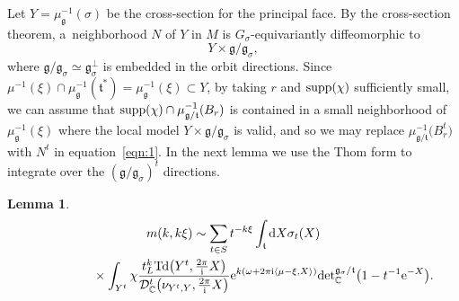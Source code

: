 \documentclass[pdftex]{sigma}
\numberwithin{equation}{section}
\newtheorem{Lemma}[Theorem]{Lemma}
\newcommand{\pair}[2]{\langle #1, #2 \rangle}
\newcommand{\tn}[1]{\textnormal{#1}}
\renewcommand{\i}{{\mathrm{i}}}
\def\g{\ensuremath{\mathfrak{g}}}
\def\t{\ensuremath{\mathfrak{t}}}
\def\bC{\ensuremath{\mathbb{C}}}
\def\supp{\ensuremath{\textnormal{supp}}}
\def\Td{\ensuremath{\textnormal{Td}}}
\def\calDC{\ensuremath{\mathcal{D}_{\bC}}}
\def\supp{\ensuremath{\textnormal{supp}}}
\def\de{\ensuremath{\tn{det}_\bC}}
\begin{document}
Let $Y=\mu_{\g}^{-1}(\sigma)$ be the cross-section for the principal face. By the cross-section theorem, a~neighborhood $N$ of $Y$ in $M$ is $G_\sigma$-equivariantly diffeomorphic to
\[ Y\times \g/\g_\sigma, \]
where $\g/\g_\sigma \simeq \g_\sigma^\perp$ is embedded in the orbit directions. Since $\mu^{-1}(\xi)\cap \mu_\g^{-1}(\t^\ast)=\mu_\g^{-1}(\xi)\subset Y$, by taking $r$ and $\supp(\chi)$ sufficiently small, we can assume that $\supp(\chi)\cap \mu_{\g/\t}^{-1}(B_r)$ is contained in a small neighborhood of $\mu_\g^{-1}(\xi)$ where the local model $Y\times \g/\g_\sigma$ is valid, and so we may replace $\mu_{\g/\t}^{-1}\big(B_r^t\big)$ with $N^t$ in equation~\eqref{eqn:1}. In the next lemma we use the Thom form to integrate over the $(\g/\g_\sigma)^t$ directions.
\begin{Lemma}
\begin{gather}
m(k,k\xi)\sim \sum_{t \in S}t^{-k\xi} \int_\t {\rm d}X \sigma_t(X)\nonumber\\
\hphantom{m(k,k\xi)\sim}{}\times \int_{Y^t} \chi \frac{t_L^k\Td\big(Y^t,\tfrac{2\pi}{\i}X\big)}{\calDC^t\big(\nu_{Y^t,Y},\tfrac{2\pi}{\i}X\big)}{\rm e}^{k(\omega+2\pi \i\pair{\mu-\xi}{X})}\de^{\g_\sigma/\t}\big(1-t^{-1}{\rm e}^{-X}\big).\label{eqn:2}
\end{gather}
\end{Lemma}
\end{document}
